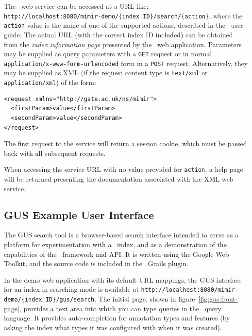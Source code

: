 The \Mimir\ web service can be accessed at a URL like:\\
{\tt http://localhost:8080/mimir-demo/\{index ID\}/search/\{action\}},
where the {\tt action} value is the name of one of the supported actions,
described in the \Mimir\ user guide. 
The actual URL (with the correct index ID included) can be
obtained from the {\em index information page} presented by  the \Mimir\ web
application.  Parameters may be supplied as query parameters with a {\tt GET}
request or in normal {\tt application/x-www-form-urlencoded} form in a
{\tt POST} request.  Alternatively, they may be supplied as XML (if the request
content type is {\tt text/xml} or {\tt application/xml}) of the form:
\begin{verbatim}
<request xmlns="http://gate.ac.uk/ns/mimir">
  <firstParam>value</firstParam>
  <secondParam>value</secondParam>
</request>
\end{verbatim}

The first request to the service will return a session cookie, which must be
passed back with all subsequent requests.

When accessing the service URL with no value provided for {\tt action}, a help
page will be returned presenting the documentation associated with the XML web
service.



\subsection{GUS Example User Interface}\label{sec:mimir-search:gus}

The GUS search tool is a browser-based search interface intended to serve as a
platform for experimentation with a \Mimir\ index, and as a demonstration of
the capabilities of the \Mimir\ framework and API.  It is written using the
Google Web Toolkit, and the source code is included in the \Mimir\ Grails
plugin.

In the demo web application with its default URL mappings, the GUS interface
for an index in searching mode is available at 
{\tt http://localhost:8080/mimir-demo/\{index ID\}/gus/search}.  The initial
page, shown in figure~\ref{fig:gus:front-page}, provides a text area into which
you can type queries in the \Mimir\ query language.  It provides
auto-completion for annotation types and features (by asking the index what
types it was configured with when it was created).

